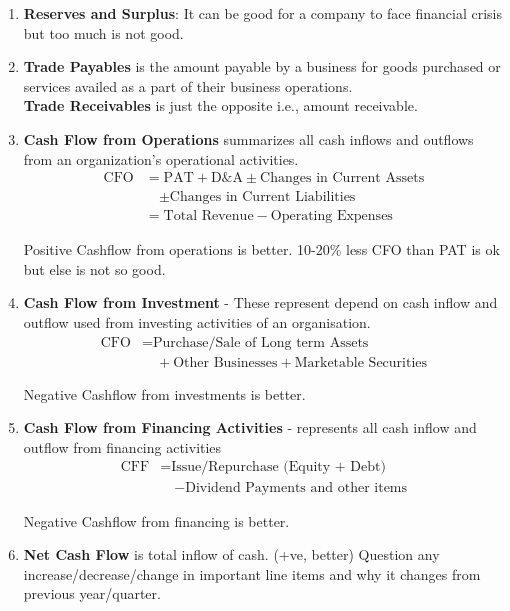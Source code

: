 \documentclass[12pt]{article}
\begin{document}
\begin{enumerate}
    \item \textbf{Reserves and Surplus}: It can be good for a company to face financial crisis but too much is not good.
    
    \item \textbf{Trade Payables} is the amount payable by a business for goods purchased or services availed as a part of their business operations. \\
    \textbf{Trade Receivables} is just the opposite i.e., amount receivable.
    
    \item \textbf{Cash Flow from Operations} summarizes all cash inflows and outflows from an organization's operational activities.
    \begin{align}
    \text{CFO} &= \text{PAT} + \text{D\&A} \pm \text{Changes in Current Assets} \\
    &\quad \pm \text{Changes in Current Liabilities}\\
    &= \text{Total Revenue} - \text{Operating Expenses}
    \end{align}
    
     Positive Cashflow from operations is better. 10-20\% less CFO than PAT is ok but else is not so good.
    
    \item \textbf{Cash Flow from Investment} - These represent depend on cash inflow and outflow used from investing activities of an organisation.
    \begin{align}
    \text{CFO} &= \text{Purchase/Sale of Long term Assets} \\
    &\quad + \text{Other Businesses} + \text{Marketable Securities}
    \end{align}

     Negative Cashflow from investments is better.
    
    \item \textbf{Cash Flow from Financing Activities} - represents all cash inflow and outflow from financing activities
    \begin{align}
    \text{CFF} &= \text{Issue/Repurchase (Equity + Debt)} \\
    &\quad - \text{Dividend Payments and other items}
    \end{align}

     Negative Cashflow from financing is better.
    
    \item \textbf{Net Cash Flow} is total inflow of cash. (+ve, better)
    Question any increase/decrease/change in important line items and why it changes from previous year/quarter.
\end{enumerate}
\end{document}
